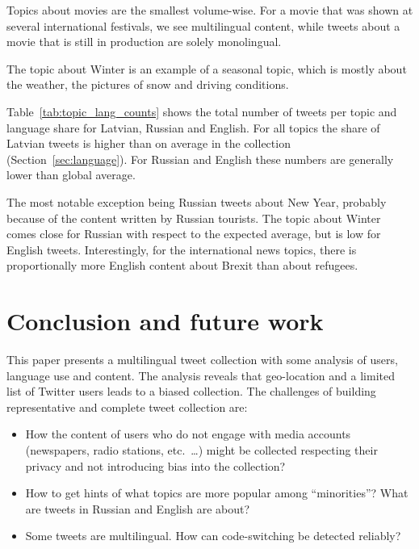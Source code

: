 \documentclass{IOS-Book-Article}
\begin{document}
Topics about movies are the smallest volume-wise. For a movie that was shown at several international festivals, we see multilingual content, while tweets about a movie that is still in production are solely monolingual.

The topic about Winter is an example of a seasonal topic, which is mostly about the weather, the pictures of snow and driving conditions.

Table~\ref{tab:topic_lang_counts} shows the total number of tweets per topic and language share for Latvian, Russian and English. For all topics the share of Latvian tweets is higher than on average in the collection (Section~\ref{sec:language}). For Russian and English these numbers are generally lower than global average.

The most notable exception being Russian tweets about New Year, probably because of the content written by Russian tourists. The topic about Winter comes close for Russian with respect to the expected average, but is low for English tweets. Interestingly, for the international news topics, there is proportionally more English content about Brexit than about refugees.



\section{Conclusion and future work}
\label{sec:conclusion}


This paper presents a multilingual tweet collection with some analysis of users, language use and content. The analysis reveals that geo-location and a limited list of Twitter users leads to a biased collection.
%
%
The challenges of building representative and complete tweet collection are:
\begin{itemize}
\item How the content of users who do not engage with media accounts (newspapers, radio stations, etc.~\ldots) might be collected respecting their privacy and not introducing bias into the collection?
\item How to get hints of what topics are more popular among ``minorities''? What are tweets in Russian and English are about?
\item Some tweets are multilingual. How can code-switching be detected reliably?
\end{itemize}





\end{document}
